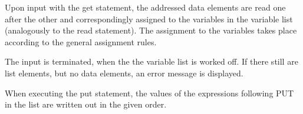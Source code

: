 







Upon input with the get statement, the addressed data elements are
read one after the other and correspondingly assigned to the variables
in the variable list (analogously to the read statement). The
assignment to the variables takes place according to the general
assignment rules.

The input is terminated, when the the variable list is worked off. If
there still are list elements, but no data elements, an error message is
displayed.

When executing the put statement, the values of the expressions
following PUT in the list are written out in the given order.

